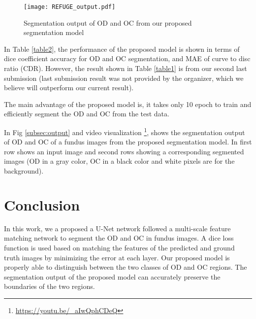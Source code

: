 \documentclass[runningheads,a4paper]{llncs}
\begin{document}
\label{subsec:output}
\begin{figure*}[htp]
\centering
\texttt{[image: REFUGE\_output.pdf]}
\caption{Segmentation output of OD and OC from our proposed segmentation model}
\label{fig:cGAN architecture}
\end{figure*}

In Table \ref{table2}, the performance of the proposed model is shown in terms of dice coefficient accuracy for OD and OC segmentation, and MAE of curve to disc ratio (CDR). However, the result shown in Table \ref{table1} is from our second last submission (last submission result was not provided by the organizer, which we believe will outperform our current result). 

The main advantage of the proposed model is, it takes only 10 epoch to train and efficiently segment the OD and OC from the test data.

In Fig \ref{subsec:output} and video visualization \footnote{\url{https://youtu.be/_aIwQphCDeQ}}, shows the segmentation output of OD and OC of a fundus images from the proposed segmentation model. In first row shows an input image and second rows showing a corresponding segmented images (OD in a gray color, OC in a black color and white pixels are for the background).
\begin{table}[htp]
\centering
\caption{Optic Disc and Cup segmentation Dice coefficient accuracy and MAE CDR  with the REFUGE challenge dataset of 400 validation images}
\label{table2}
\end{table}

\section{Conclusion}

In this work, we a proposed a U-Net network followed a multi-scale feature matching network to segment the OD and OC in fundus images. A dice loss function is used based on matching the features of the predicted and ground truth images by minimizing the error at each layer. Our proposed model is properly able to distinguish between the two classes of OD and OC regions. The segmentation output of the proposed model can accurately preserve the boundaries of the two regions.


 
\end{document}
